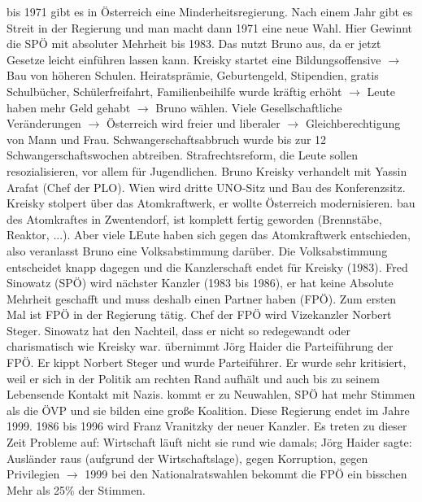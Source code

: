 \documentclass[a4paper,final]{report}
\begin{document}
\newline
{} bis 1971 gibt es in Österreich eine Minderheitsregierung. Nach einem Jahr gibt es Streit in der Regierung und man macht dann 1971 eine neue Wahl. Hier Gewinnt die SPÖ mit absoluter Mehrheit bis 1983. Das nutzt Bruno aus, da er jetzt Gesetze leicht einführen lassen kann.
\newline
\newline
Kreisky startet eine Bildungsoffensive $\rightarrow$ Bau von höheren Schulen. Heiratsprämie, Geburtengeld, Stipendien, gratis Schulbücher, Schülerfreifahrt, Familienbeihilfe wurde kräftig erhöht $\rightarrow$ Leute haben mehr Geld gehabt $\rightarrow$ Bruno wählen. Viele Gesellschaftliche Veränderungen $\rightarrow$ Österreich wird freier und liberaler $\rightarrow$ Gleichberechtigung von Mann und Frau. Schwangerschaftsabbruch wurde bis zur 12 Schwangerschaftswochen abtreiben.
\newline
\newline
Strafrechtsreform, die Leute sollen resozialisieren, vor allem für Jugendlichen. Bruno Kreisky verhandelt mit Yassin Arafat (Chef der PLO). Wien wird dritte UNO-Sitz und Bau des Konferenzsitz.
\newline
\newline
Kreisky stolpert über das Atomkraftwerk, er wollte Österreich modernisieren. bau des Atomkraftes in Zwentendorf, ist komplett fertig geworden (Brennstäbe, Reaktor, ...). Aber viele LEute haben sich gegen das Atomkraftwerk entschieden, also veranlasst Bruno eine Volksabstimmung darüber. Die Volksabstimmung entscheidet knapp dagegen und die Kanzlerschaft endet für Kreisky (1983).
\newline
\newline
Fred Sinowatz (SPÖ) wird nächster Kanzler (1983 bis 1986), er hat keine Absolute Mehrheit geschafft und muss deshalb einen Partner haben (FPÖ). Zum ersten Mal ist FPÖ in der Regierung tätig. Chef der FPÖ wird Vizekanzler Norbert Steger. Sinowatz hat den Nachteil, dass er nicht so redegewandt oder charismatisch wie Kreisky war.
\newline
{} übernimmt Jörg Haider die Parteiführung der FPÖ. Er kippt Norbert Steger und wurde Parteiführer. Er wurde sehr kritisiert, weil er sich in der Politik am rechten Rand aufhält und auch bis  zu seinem Lebensende Kontakt mit Nazis. 
\newline
{} kommt er zu Neuwahlen, SPÖ hat mehr Stimmen als die ÖVP und sie bilden eine große Koalition. Diese Regierung endet im Jahre 1999. 1986 bis 1996 wird Franz Vranitzky der neuer Kanzler. Es treten zu dieser Zeit Probleme auf: Wirtschaft läuft nicht sie rund wie damals; Jörg Haider sagte: Ausländer raus (aufgrund der Wirtschaftslage), gegen Korruption, gegen Privilegien $\rightarrow$ 1999 bei den Nationalratswahlen bekommt die FPÖ ein bisschen Mehr als 25\% der Stimmen.
\end{document}
